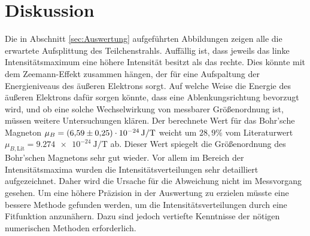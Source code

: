 \section{Diskussion}
\label{sec:Diskussion}
Die in Abschnitt \ref{sec:Auswertung} aufgeführten Abbildungen zeigen alle die erwartete Aufsplittung des Teilchenstrahls.
Auffällig ist, dass jeweils das linke Intensitätsmaximum eine höhere Intensität besitzt als das rechte.
Dies könnte mit dem Zeemann-Effekt zusammen hängen, der für eine Aufspaltung der Energieniveaus des äußeren Elektrons sorgt.
Auf welche Weise die Energie des äußeren Elektrons dafür sorgen könnte, dass eine Ablenkungsrichtung bevorzugt wird, und ob eine solche Wechselwirkung von messbarer Größenordnung ist, müssen weitere Untersuchungen klären.
Der berechnete Wert für das Bohr'sche Magneton $\mu_B = \SI{6.59 \pm 0.25 e-24}{\joule\per\tesla}$ weicht um $28,9\%$ vom Literaturwert $\mu_{B,\text{Lit}} = \SI{9.274e-24}{\joule\per\tesla}$ \cite{nist} ab.
Dieser Wert spiegelt die Größenordnung des Bohr'schen Magnetons sehr gut wieder.
Vor allem im Bereich der Intensitätsmaxima wurden die Intensitätsverteilungen sehr detailliert aufgezeichnet.
Daher wird die Ursache für die Abweichung nicht im Messvorgang gesehen.
Um eine höhere Präzision in der Auswertung zu erzielen müsste eine bessere Methode gefunden werden, um die Intensitätsverteilungen durch eine Fitfunktion anzunähern.
Dazu sind jedoch vertiefte Kenntnisse der nötigen numerischen Methoden erforderlich.